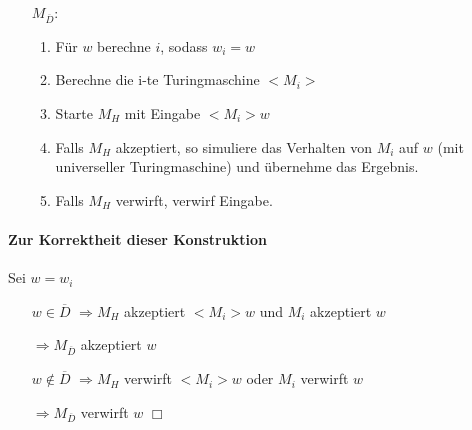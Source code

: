 \begin{itemize}
	\item[$M_{\overline{D}}$:] \begin{enumerate}
		\item Für $w$ berechne $i$, sodass $w_i=w$
		\item Berechne die i-te  Turingmaschine $<M_i>$ 
		\item Starte $M_H$ mit Eingabe $<M_i>w$
		\item Falls $M_H$ akzeptiert, so simuliere das Verhalten von $M_i$ auf $w$ (mit universeller Turingmaschine) und übernehme das Ergebnis.
		\item Falls $M_H$ verwirft, verwirf Eingabe.
	\end{enumerate}
\end{itemize}

\paragraph*{Zur Korrektheit dieser Konstruktion} Sei $w=w_i$
\begin{itemize}
	\item[$w\in\overline{D}$] $\Rightarrow M_H$ akzeptiert $<M_i>w$ und $M_i$ akzeptiert $w$
	\item[] $\Rightarrow M_{\overline{D}}$ akzeptiert $w$
	\item[$w\not\in\overline{D}$] $\Rightarrow M_H$ verwirft $<M_i>w$ oder $M_i$ verwirft $w$
	\item[] $\Rightarrow M_{\overline{D}}$ verwirft $w$ \hspace{1cm} $\Box$
\end{itemize}